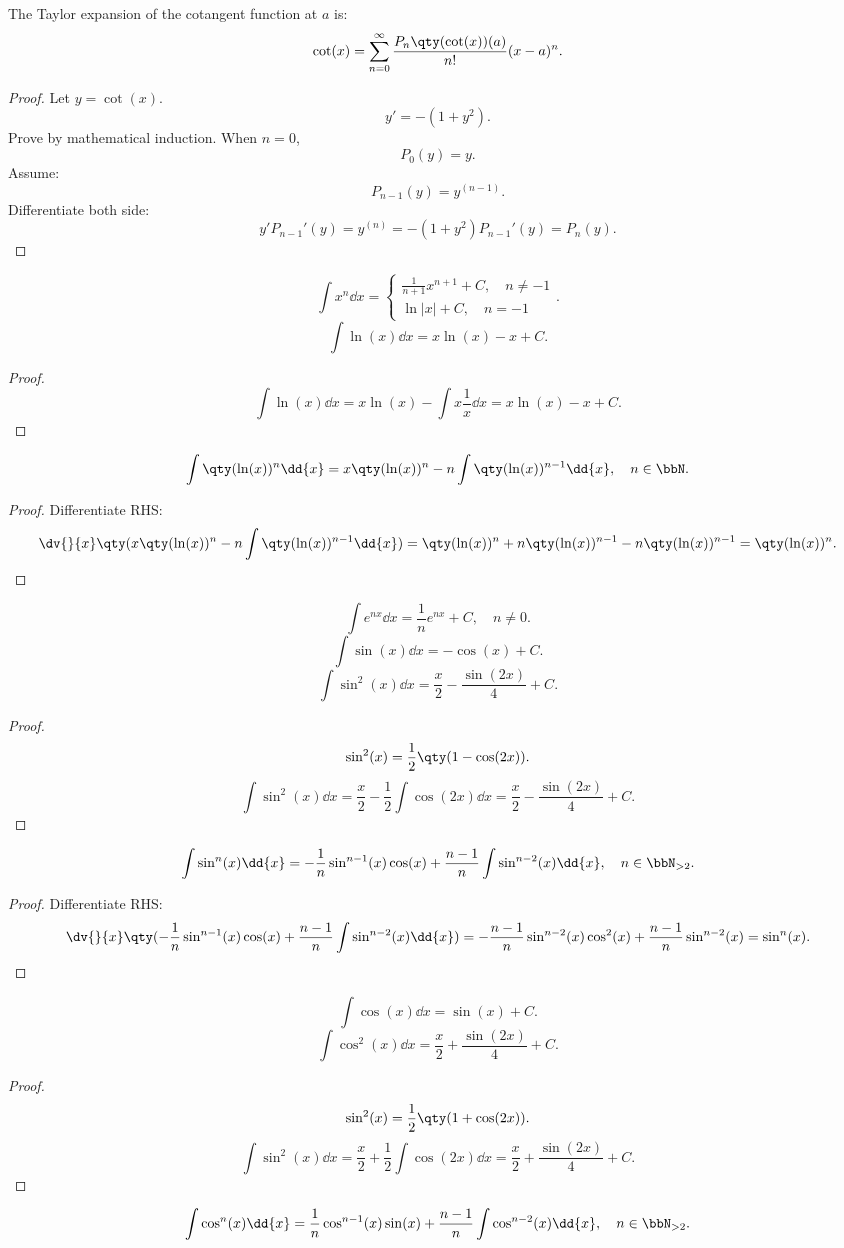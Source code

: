 \documentclass[a4paper,12pt]{report}
\begin{document}
\begin{itemize}
\begin{itemize}
The Taylor expansion of the cotangent function at $a$ is:
\[\cot(x)=\sum_{n=0}^{\infty}\frac{P_n\qty(\cot(x))(a)}{n!}(x-a)^n.\]
\begin{proof}
Let $y=\cot(x)$.
\[y'=-(1+y^2).\]
Prove by mathematical induction. When $n=0$,
\[P_0(y)=y.\]
Assume:
\[P_{n-1}(y)=y^{(n-1)}.\]
Differentiate both side:
\[y'P_{n-1}'(y)=y^{(n)}=-(1+y^2)P_{n-1}'(y)=P_n(y).\]
\end{proof}
\[\int x^n\dd{x}=\begin{cases}\frac{1}{n+1}x^{n+1}+C,\quad n\neq -1\\\ln|x|+C,\quad n=-1\end{cases}.\]
\[\int\ln(x)\dd{x}=x\ln(x)-x+C.\]
\begin{proof}
    \[\int\ln(x)\dd{x}=x\ln(x)-\int x\frac{1}{x}\dd{x}=x\ln(x)-x+C.\]
\end{proof}
\[\int\qty(\ln(x))^n\dd{x}=x\qty(\ln(x))^n-n\int\qty(\ln(x))^{n-1}\dd{x},\quad n\in\bbN.\]
\begin{proof}
    Differentiate RHS:
    \[\dv{}{x}\qty(x\qty(\ln(x))^n-n\int\qty(\ln(x))^{n-1}\dd{x})=\qty(\ln(x))^n+n\qty(\ln(x))^{n-1}-n\qty(\ln(x))^{n-1}=\qty(\ln(x))^n.\]
\end{proof}
\[\int e^{nx}\dd{x}=\frac{1}{n}e^{nx}+C,\quad n\neq 0.\]
\[\int\sin(x)\dd{x}=-\cos(x)+C.\]
\[\int\sin^2(x)\dd{x}=\frac{x}{2}-\frac{\sin(2x)}{4}+C.\]
\begin{proof}
    \[\sin^2(x)=\frac{1}{2}\qty(1-\cos(2x)).\]
    \[\int\sin^2(x)\dd{x}=\frac{x}{2}-\frac{1}{2}\int\cos(2x)\dd{x}=\frac{x}{2}-\frac{\sin(2x)}{4}+C.\]
\end{proof}
\[\int\sin^n(x)\dd{x}=-\frac{1}{n}\sin^{n-1}(x)\cos(x)+\frac{n-1}{n}\int\sin^{n-2}(x)\dd{x},\quad n\in\bbN_{>2}.\]
\begin{proof}
    Differentiate RHS:
    \[\dv{}{x}\qty(-\frac{1}{n}\sin^{n-1}(x)\cos(x)+\frac{n-1}{n}\int\sin^{n-2}(x)\dd{x})=-\frac{n-1}{n}\sin^{n-2}(x)\cos^2(x)+\frac{n-1}{n}\sin^{n-2}(x)=\sin^n(x).\]
\end{proof}
\[\int\cos(x)\dd{x}=\sin(x)+C.\]
\[\int\cos^2(x)\dd{x}=\frac{x}{2}+\frac{\sin(2x)}{4}+C.\]
\begin{proof}
    \[\sin^2(x)=\frac{1}{2}\qty(1+\cos(2x)).\]
    \[\int\sin^2(x)\dd{x}=\frac{x}{2}+\frac{1}{2}\int\cos(2x)\dd{x}=\frac{x}{2}+\frac{\sin(2x)}{4}+C.\]
\end{proof}
\[\int\cos^n(x)\dd{x}=\frac{1}{n}\cos^{n-1}(x)\sin(x)+\frac{n-1}{n}\int\cos^{n-2}(x)\dd{x},\quad n\in\bbN_{>2}.\]

\end{itemize}
\end{itemize}
\end{document}
